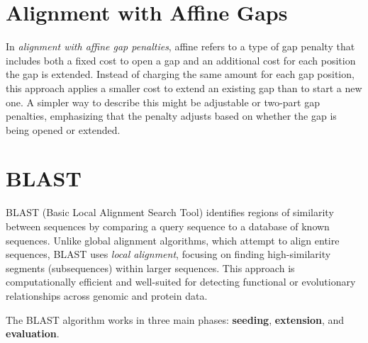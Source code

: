 \section{Alignment with Affine Gaps}

In {\em alignment with affine gap penalties}, affine refers to a type of gap penalty that includes both a fixed cost to open a gap and an additional cost for each position the gap is extended. Instead of charging the same amount for each gap position, this approach applies a smaller cost to extend an existing gap than to start a new one. A simpler way to describe this might be adjustable or two-part gap penalties, emphasizing that the penalty adjusts based on whether the gap is being opened or extended.

\section{BLAST}

BLAST (Basic Local Alignment Search Tool) identifies regions of similarity between sequences by comparing a query sequence to a database of known sequences. Unlike global alignment algorithms, which attempt to align entire sequences, BLAST uses \textit{local alignment}, focusing on finding high-similarity segments (subsequences) within larger sequences. This approach is computationally efficient and well-suited for detecting functional or evolutionary relationships across genomic and protein data.

The BLAST algorithm works in three main phases: \textbf{seeding}, \textbf{extension}, and \textbf{evaluation}.

